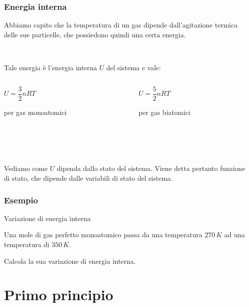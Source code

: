 \documentclass[]{beamer}
\theoremstyle{plain}
\begin{document}
\begin{frame}
\frametitle{Energia interna}
Abbiamo capito che la temperatura di un gas dipende dall'agitazione termica delle sue particelle, che possiedono quindi una certa energia.\pause

~

Tale energia è l'energia interna $ U $ del sistema e vale:
\begin{columns}
\begin{column}{0.4\textwidth}
\begin{center}
$ U = \dfrac{3}{2}nRT $

\vspace*{.7em}
per gas monoatomici
\end{center}
\end{column}
\begin{column}{0.4\textwidth}
\begin{center}
$ U = \dfrac{5}{2}nRT $

\vspace*{.7em}
per gas biatomici
\end{center}
\end{column}
\end{columns}\pause

~

~

Vediamo come $ U $ dipenda dallo stato del sistema. Viene detta pertanto \alert{funzione di stato}, che dipende dalle variabili di stato del sistema.
\end{frame}



\begin{frame}
\frametitle{Esempio}
\begin{exampleblock}{Variazione di energia interna}
{\small Una mole di gas perfetto monoatomico passa da una temperatura $ 270 \, K $ ad una temperatura di $ 350 \, K $.

Calcola la sua variazione di energia interna.}
\end{exampleblock}
\end{frame}




\section{Primo principio}
\end{document}
